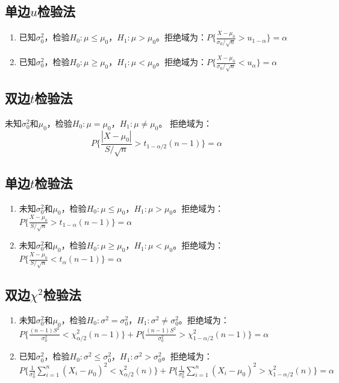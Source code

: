 \documentclass[a4paper,12pt]{ctexart}
\begin{document}
\subsection{单边$u$检验法}

\begin{enumerate}
	\item 已知$\sigma_0^2$，检验$H_0: \mu \leq \mu_0$，$H_1: \mu > \mu_0$。拒绝域为：$P\{\frac{X - \mu_0}{\sigma_0 / \sqrt{n}} > u_{1-\alpha}\} = \alpha$
	\item 已知$\sigma_0^2$，检验$H_0: \mu \geq \mu_0$，$H_1: \mu < \mu_0$。拒绝域为：$P\{\frac{X - \mu_0}{\sigma_0 / \sqrt{n}} < u_{\alpha}\} = \alpha$
\end{enumerate}

\subsection{双边$t$检验法}

未知$\sigma_0^2$和$\mu_0$，检验$H_0: \mu = \mu_0$，$H_1: \mu \neq \mu_0$。
拒绝域为：
\begin{equation*}
	P\{\frac{|X - \mu_0|}{S / \sqrt{n}} > t_{1-\alpha/2}(n-1)\} = \alpha
\end{equation*}

\subsection{单边$t$检验法}

\begin{enumerate}
	\item 未知$\sigma_0^2$和$\mu_0$，检验$H_0: \mu \leq \mu_0$，$H_1: \mu > \mu_0$。拒绝域为：$P\{\frac{X - \mu_0}{S / \sqrt{n}} > t_{1-\alpha}(n-1)\} = \alpha$
	\item 未知$\sigma_0^2$和$\mu_0$，检验$H_0: \mu \geq \mu_0$，$H_1: \mu < \mu_0$。拒绝域为：$P\{\frac{X - \mu_0}{S / \sqrt{n}} < t_{\alpha}(n-1)\} = \alpha$
\end{enumerate}

\subsection{双边$\chi^2$检验法}

\begin{enumerate}
	\item 未知$\sigma_0^2$和$\mu_0$，检验$H_0: \sigma^2 = \sigma_0^2$，$H_1: \sigma^2 \neq \sigma_0^2$。拒绝域为：$P\{\frac{(n-1)S^2}{\sigma_0^2} < \chi_{\alpha/2}^2(n-1)\} + P\{\frac{(n-1)S^2}{\sigma_0^2} > \chi_{1-\alpha/2}^2(n-1)\} = \alpha$
	\item 已知$\sigma_0^2$，检验$H_0: \sigma^2 \leq \sigma_0^2$，$H_1: \sigma^2 > \sigma_0^2$。拒绝域为：$P\{\frac{1}{\sigma_0^2} \sum_{i=1}^n(X_i - \mu_0)^2 < \chi_{\alpha/2}^2(n)\} + P\{\frac{1}{\sigma_0^2} \sum_{i=1}^n(X_i - \mu_0)^2 > \chi_{1-\alpha/2}^2(n)\} = \alpha$
\end{enumerate}
\end{document}
